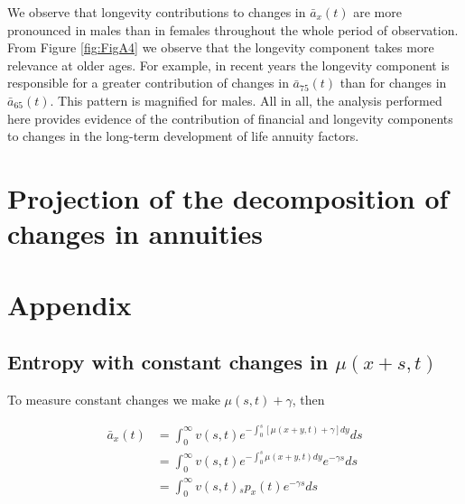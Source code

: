 \documentclass[12pt]{article}
\begin{document}
 
We observe that longevity contributions to changes in $\bar{a}_x(t)$ are more pronounced in males than in females throughout the whole period of observation. From Figure \ref{fig:FigA4} we observe that the longevity component takes more relevance at older ages. For example, in recent years the longevity component is responsible for a greater contribution of changes in $\bar{a}_{75}(t)$ than for changes in $\bar{a}_{65}(t)$. This pattern is magnified for males. All in all, the analysis performed here provides evidence of the contribution of financial and longevity components to changes in the long-term development of life annuity factors.













\FloatBarrier
\section{Projection of the decomposition of changes in annuities}









\newpage


%
%



\newpage

\appendix
\section{Appendix}



\subsection{Entropy with constant changes in $\mu(x+s,t)$}\label{sec:EntropyConst}

To measure constant changes we make $\mu(s,t)+\gamma$, then

\begin{equation}\label{eq:EntropyConst1}
\begin{split}
\bar{a}_{x}(t) &= \int_0^\infty{v}(s,t) e^{-\int_{0}^{s} [\mu(x+y,t)+\gamma]dy}ds \\
&= \int_0^\infty {v}(s,t)e^{-\int_{0}^{s} \mu(x+y,t)dy} e^{-\gamma s}ds \\
&= \int_0^\infty {v}(s,t){}_sp_x(t) e^{-\gamma s}ds \\
\end{split}
\end{equation}
\end{document}
